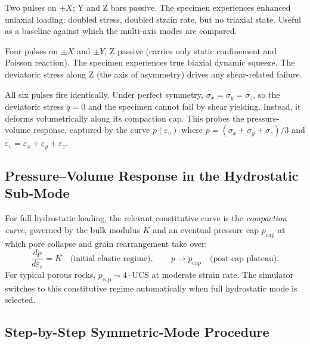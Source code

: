 \documentclass[11pt,a4paper]{article}
\newcommand{\sig}{\sigma}
\newcommand{\eps}{\varepsilon}
\begin{document}
\begin{description}[leftmargin=2em, style=nextline]
  \item[Symmetric $\pm X$ only]
    Two pulses on $\pm X$; Y and Z bars passive. The specimen experiences
    enhanced uniaxial loading: doubled stress, doubled strain rate, but no
    triaxial state. Useful as a baseline against which the multi-axis modes
    are compared.

  \item[Symmetric $\pm X \pm Y$ (biaxial)]
    Four pulses on $\pm X$ and $\pm Y$; Z passive (carries only static
    confinement and Poisson reaction). The specimen experiences true biaxial
    dynamic squeeze. The deviatoric stress along Z (the axis of asymmetry)
    drives any shear-related failure.

  \item[Full hydrostatic ($\pm X, \pm Y, \pm Z$)]
    All six pulses fire identically. Under perfect symmetry,
    $\sig_x = \sig_y = \sig_z$, so the deviatoric stress
    $q = 0$ and the specimen cannot fail by shear yielding. Instead, it
    deforms volumetrically along its compaction cap. This probes the
    pressure-volume response, captured by the curve $p(\eps_v)$ where
    $p = (\sig_x + \sig_y + \sig_z)/3$ and $\eps_v = \eps_x + \eps_y + \eps_z$.
\end{description}

\subsection{Pressure--Volume Response in the Hydrostatic Sub-Mode}

For full hydrostatic loading, the relevant constitutive curve is the
\emph{compaction curve}, governed by the bulk modulus $K$ and an eventual
pressure cap $p_{\text{cap}}$ at which pore collapse and grain rearrangement
take over:
\begin{equation}
  \frac{dp}{d\eps_v} = K \quad \text{(initial elastic regime)},
  \qquad
  p \to p_{\text{cap}} \quad \text{(post-cap plateau)}.
\end{equation}
For typical porous rocks, $p_{\text{cap}} \sim 4 \cdot \text{UCS}$ at moderate
strain rate. The simulator switches to this constitutive regime automatically
when full hydrostatic mode is selected.

\subsection{Step-by-Step Symmetric-Mode Procedure}
\end{document}
